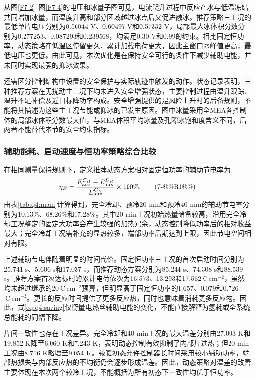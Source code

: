 从图\ref{F7-2}--图\ref{F7-4}的电压和冰量子图可见，电流爬升过程中反应产水与低温冻结共同增加冰量，而温度升高和部分区域越过冰点后又促进融冰。推荐策略三工况的最低单片电压分别为0.56044 V、0.60497 V和0.57332 V，局部最大冰体积分数分别为0.277253、0.087293和0.239568，均满足0.30 V和0.99的约束。相比固定恒功率，动态策略在低温区停留更久、累计加载电荷更大，因此主窗口冰峰值更高，最低电压也更低。由此可见，本次优化是在保持安全可行的条件下减少辅助电能，并未同时实现最强的抑冰效果。

还需区分控制结构中设置的安全保护与实际轨迹中触发的动作。状态记录表明，三种推荐方案在无扰动主工况下均未进入安全增强状态，主要控制过程由温升跟踪、温升不足补偿及近目标降功率构成。安全增强提供的是风险上升时的后备规则，不能将其描述为这些主工况节能或抑冰的已发生原因。图中冰量采用全MEA各控制体的局部冰体积分数最大值，与MEA体积平均冰量及孔隙冰饱和度含义不同，后两者不能替代本节的安全约束指标。

\subsubsection{辅助能耗、启动速度与恒功率策略综合比较}

在相同测量保持规则下，定义推荐动态方案相对固定恒功率的辅助节电率为
\begin{equation}
\eta_E=\frac{E_{\rm aux}^{C_H}-E_{\rm aux}^{D_R}}{E_{\rm aux}^{C_H}}\times100\%.
\tag{7-@@R1@@}\label{eq:q4:saving}
\end{equation}
由表\ref{tab:q4:main}计算得到，完全冷却、预冷20 min和预冷40 min的辅助节电率分别为10.13\%、68.26\%和17.28\%。其中20 min工况初始热量储备较高，沿用完全冷却工况整定的固定大功率会产生较强的加热冗余，动态控制降低功率后的相对收益最大；完全冷却工况需补充的显热较多，端部功率后期达到上限，因此节电空间相对有限。

上述辅助节电伴随着明显的时间代价。固定恒功率三工况的首次启动时间分别为25.741 s、5.606 s和17.037 s，而推荐动态方案分别为85.244 s、74.308 s和88.539 s。推荐方案首次达标时的累计电荷依次为16.573、13.293和17.562\(\ \mathrm{C\,cm^{-2}}\)，虽然均未超过继承的20\(\ \mathrm{C\,cm^{-2}}\)预算，但明显高于固定恒功率的1.657、0.079和0.726\(\ \mathrm{C\,cm^{-2}}\)。更长的反应时间提供了更多反应热，同时也意味着消耗更多反应物。因此，式\eqref{eq:q4:saving}仅衡量电热丝辅助电能的变化，不能直接解释为氢耗或全系统总能耗的同幅下降。

片间一致性也存在工况差异。完全冷却和40 min工况的最大温差分别由27.003 K和19.852 K降至6.060 K和7.243 K，表明动态控制有效抑制了内部片过热；但20 min工况由8.716 K略增至9.054 K。较暖初态允许控制器长时间采用较小辅助功率，端部热损失与内部反应热的不均衡仍会逐步形成温差。因此，动态策略对温差的改善主要体现在本次两个较冷工况，不能概括为所有初态下一致性均优于恒功率。

